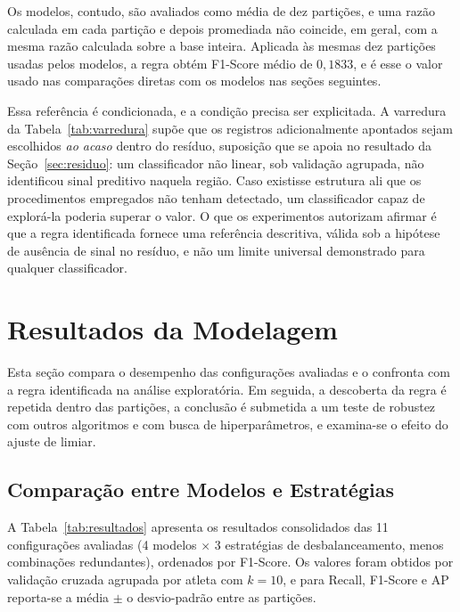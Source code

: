 Os modelos, contudo, são avaliados como média de dez partições, e uma razão calculada em cada partição e depois promediada não coincide, em geral, com a mesma razão calculada sobre a base inteira. Aplicada às mesmas dez partições usadas pelos modelos, a regra obtém F1-Score médio de $0{,}1833$, e é esse o valor usado nas comparações diretas com os modelos nas seções seguintes.

Essa referência é condicionada, e a condição precisa ser explicitada. A varredura da Tabela~\ref{tab:varredura} supõe que os registros adicionalmente apontados sejam escolhidos \textit{ao acaso} dentro do resíduo, suposição que se apoia no resultado da Seção~\ref{sec:residuo}: um classificador não linear, sob validação agrupada, não identificou sinal preditivo naquela região. Caso existisse estrutura ali que os procedimentos empregados não tenham detectado, um classificador capaz de explorá-la poderia superar o valor. O que os experimentos autorizam afirmar é que a regra identificada fornece uma referência descritiva, válida sob a hipótese de ausência de sinal no resíduo, e não um limite universal demonstrado para qualquer classificador.

\section{Resultados da Modelagem}

Esta seção compara o desempenho das configurações avaliadas e o confronta com a regra identificada na análise exploratória. Em seguida, a descoberta da regra é repetida dentro das partições, a conclusão é submetida a um teste de robustez com outros algoritmos e com busca de hiperparâmetros, e examina-se o efeito do ajuste de limiar.

\subsection{Comparação entre Modelos e Estratégias}

A Tabela~\ref{tab:resultados} apresenta os resultados consolidados das 11 configurações avaliadas (4 modelos $\times$ 3 estratégias de desbalanceamento, menos combinações redundantes), ordenados por F1-Score. Os valores foram obtidos por validação cruzada agrupada por atleta com $k = 10$, e para Recall, F1-Score e AP reporta-se a média $\pm$ o desvio-padrão entre as partições.

